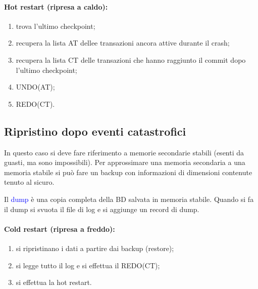 \paragraph{Hot restart (ripresa a caldo):}

\begin{enumerate}
    \item trova l'ultimo checkpoint;
    \item recupera la lista AT dellee transazioni ancora attive durante il crash;
    \item recupera la lista CT delle transazioni che hanno raggiunto il commit dopo l'ultimo checkpoint;
    \item UNDO(AT);
    \item REDO(CT).
\end{enumerate}

\subsection{Ripristino dopo eventi catastrofici}

In questo caso si deve fare riferimento a memorie secondarie stabili (esenti da guasti, ma sono impossibili). Per approssimare una memoria secondaria a una memoria stabile si può fare un backup con informazioni di dimensioni contenute tenuto al sicuro.

Il \textcolor{blue}{dump} è una copia completa della BD salvata in memoria stabile. Quando si fa il dump si svuota il file di log e si aggiunge un record di dump.

\paragraph{Cold restart (ripresa a freddo):}

\begin{enumerate}
    \item si ripristinano i dati a partire dai backup (restore);
    \item si legge tutto il log e si effettua il REDO(CT);
    \item si effettua la hot restart.
\end{enumerate}